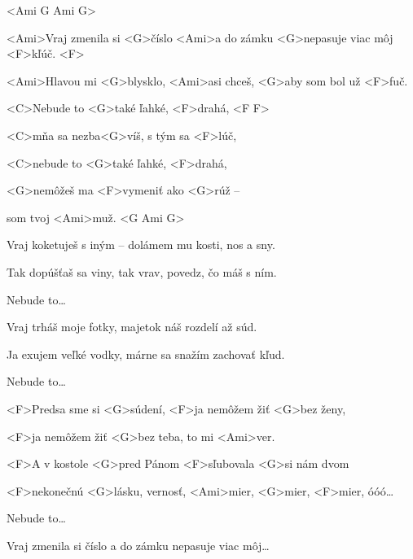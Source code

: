 


<Ami G Ami G>

\zs
<Ami>Vraj zmenila si <G>číslo <Ami>a do zámku <G>nepasuje viac môj <F>kľúč. <F>

<Ami>Hlavou mi <G>blysklo, <Ami>asi chceš, <G>aby som bol už <F>fuč.
\ks

\zr
<C>Nebude to <G>také ľahké, <F>drahá, <F F>

<C>mňa sa nezba<G>víš, s tým sa <F>lúč,

<C>nebude to <G>také ľahké, <F>drahá,

<G>nemôžeš ma <F>vymeniť ako <G>rúž –

som tvoj <Ami>muž. <G Ami G>
\kr

\zs
Vraj koketuješ s iným – dolámem mu kosti, nos a sny.

Tak dopúšťaš sa viny, tak vrav, povedz, čo máš s ním.
\ks

\zr
Nebude to…
\kr

\zs
Vraj trháš moje fotky, majetok náš rozdelí až súd.

Ja exujem veľké vodky, márne sa snažím zachovať kľud.
\ks

\zr
Nebude to…
\kr

\zs
<F>Predsa sme si <G>súdení, <F>ja nemôžem žiť <G>bez ženy,

<F>ja nemôžem žiť <G>bez teba, to mi <Ami>ver.

<F>A v kostole <G>pred Pánom <F>sľubovala <G>si nám dvom

<F>nekonečnú <G>lásku, vernosť, <Ami>mier, <G>mier, <F>mier, óóó…
\ks

\zr
Nebude to…
\kr

\zs
Vraj zmenila si číslo a do zámku nepasuje viac môj…
\ks

\kp
